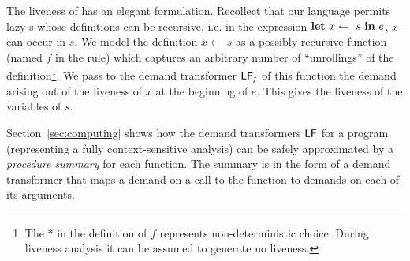 \documentclass[9pt]{sigplanconf}
\newcommand{\mycomment}[1]{}
\begin{document}
 The liveness  of {\LET} has  an elegant formulation.   Recollect that
 our language permits lazy {\LET}s whose definitions can be recursive,
 i.e.  in the expression $\mbox{$\mathbf{ let}$}~x \leftarrow~s~\mbox{$\mathbf{ in}$}~e$, $x$ can occur in
 $s$.   We  model  the  definition  $x  \leftarrow~s$  as  a  possibly
 recursive function (named $\mathit{f}$ in the rule) which captures an
 arbitrary number of ``unrollings'' of the definition\footnote{The $*$
   in  the definition  of ${\mathit  f}$ represents  non-deterministic
   choice.  During liveness analysis it  can be assumed to generate no
   liveness.}.  We  pass to  the demand  transformer $\mathsf{LF}_{\mathit
   f}$ of this function the demand  arising out of the liveness of $x$
 at the beginning of $e$. This  gives the liveness of the variables of
 $s$.


\mycomment{The function  $\mathcal{L}$ now gives  the (total) liveness
  of  an   expression  $e$.   The  cases  $\SRETURN$   and  $\SIF$  are
  straightforward, but note the liveness $x.\epsilon$ generated by the
  latter.   The case  $(\LET\  z\leftarrow s\  \IN\  e')$ resembles  a
  three-address instruction:  the liveness of  $e$ is given  by taking
  the liveness, $\Lv$, of $e'$, killing any liveness of $z$ and adding
  any incremental  liveness from  $s$.  The main  subtlety is  how the
  liveness of  $z$ in $\Lv$  is converted to  a demand $\Lv(z)$  to be
  placed on $s$ via $\mathit{ref}(s,\Lv(z),\Lfonly)$.


We make three observations: firstly the rule ({\sc live-define}) has a
least  solution  as  $\mathcal{L}(\cdot)$  is monotonic  in  $\sigma$;
secondly  that  ({\sc  live-define})   resembles  the  rule  for  type
inference of mutually recursive  function definitions, and thirdly the
asymmetry of  demand and liveness (compared to  post- and pre-liveness
classically) is due to the functional formulation here.
}

Section~\ref{sec:computing}   shows   how  the   demand   transformers
$\mathsf{LF}$  for  a  program  (representing  a  fully  context-sensitive
analysis) can be safely approximated  by a {\em procedure summary} for
each function.   The summary is  in the  form of a  demand transformer
that maps a demand on a call to the function to demands on each of its
arguments.
\end{document}
